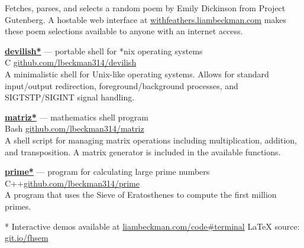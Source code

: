 Fetches, parses, and selects a random poem by Emily Dickinson from Project Gutenberg. A hostable web interface at \textcolor{my-blue}{\href{https://withfeathers.liambeckman.com}{withfeathers.liambeckman.com}} makes these poem selections available to anyone with an internet access.

\textcolor{my-grey}{\dotfill}
\medbreak

\textcolor{my-blue}{\textbf{\href{https://liambeckman.com/code/devilish}{devilish*}}} --- portable shell for *nix operating systems\\
\textcolor{my-grey}{C \hfill \href{https://github.com/lbeckman314/devilish}{github.com/lbeckman314/devilish}}\\

A minimalistic shell for Unix-like operating systems. Allows for standard input/output redirection, foreground/background processes, and SIGTSTP/SIGINT signal handling. 

\textcolor{my-grey}{\dotfill}
\medbreak

\textcolor{my-blue}{\textbf{\href{https://liambeckman.com/code/matriz}{matriz*}}} --- mathematics shell program\\
\textcolor{my-grey}{Bash \hfill \href{https://github.com/lbeckman314/matriz}{github.com/lbeckman314/matriz}}\\

A shell script for managing matrix operations including multiplication, addition, and transposition. A matrix generator is included in the available functions.

\textcolor{my-grey}{\dotfill}
\medbreak

\textcolor{my-blue}{\textbf{\href{https://liambeckman.com/code/matriz}{prime*}}} --- program for calculating large prime numbers\\
\textcolor{my-grey}{C++\hfill \href{https://github.com/lbeckman314/prime}{github.com/lbeckman314/prime}}\\

A program that uses the Sieve of Eratosthenes to compute the first million primes.

\textcolor{my-grey}{\dotfill}
\medbreak

\vfill
* Interactive demos available at \textcolor{my-blue}{\href{https://liambeckman.com/code#terminal}{liambeckman.com/code\#terminal}}
\hfill\textcolor{my-red}{\LaTeX{} source: \href{https://git.io/fhsem}{git.io/fhsem}}


